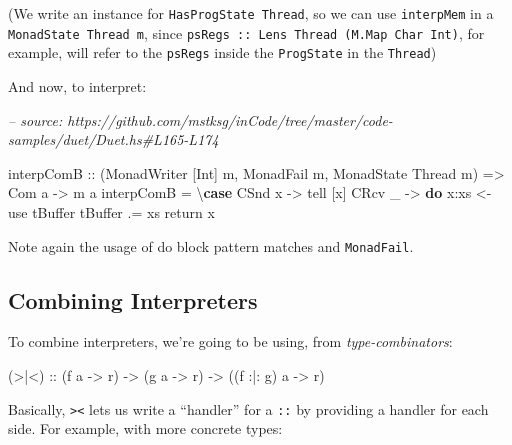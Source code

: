 \documentclass[]{article}
\newenvironment{Shaded}{}{}
\newcommand{\CommentTok}[1]{\textcolor[rgb]{0.38,0.63,0.69}{\textit{#1}}}
\newcommand{\DataTypeTok}[1]{\textcolor[rgb]{0.56,0.13,0.00}{#1}}
\newcommand{\FunctionTok}[1]{\textcolor[rgb]{0.02,0.16,0.49}{#1}}
\newcommand{\KeywordTok}[1]{\textcolor[rgb]{0.00,0.44,0.13}{\textbf{#1}}}
\newcommand{\NormalTok}[1]{#1}
\newcommand{\OtherTok}[1]{\textcolor[rgb]{0.00,0.44,0.13}{#1}}
\begin{document}
(We write an instance for \texttt{HasProgState\ Thread}, so we can use
\texttt{interpMem} in a \texttt{MonadState\ Thread\ m}, since
\texttt{psRegs\ ::\ Lens\textquotesingle{}\ Thread\ (M.Map\ Char\ Int)}, for
example, will refer to the \texttt{psRegs} inside the \texttt{ProgState} in the
\texttt{Thread})

And now, to interpret:

\begin{Shaded}
\begin{Highlighting}[]
\CommentTok{-- source: https://github.com/mstksg/inCode/tree/master/code-samples/duet/Duet.hs#L165-L174}

\NormalTok{interpComB}
\OtherTok{    ::}\NormalTok{ (}\DataTypeTok{MonadWriter}\NormalTok{ [}\DataTypeTok{Int}\NormalTok{] m, }\DataTypeTok{MonadFail}\NormalTok{ m, }\DataTypeTok{MonadState} \DataTypeTok{Thread}\NormalTok{ m)}
    \OtherTok{=>} \DataTypeTok{Com}\NormalTok{ a}
    \OtherTok{->}\NormalTok{ m a}
\NormalTok{interpComB }\FunctionTok{=}\NormalTok{ \textbackslash{}}\KeywordTok{case}
    \DataTypeTok{CSnd}\NormalTok{ x }\OtherTok{->}\NormalTok{ tell [x]}
    \DataTypeTok{CRcv}\NormalTok{ _ }\OtherTok{->} \KeywordTok{do}
\NormalTok{      x}\FunctionTok{:}\NormalTok{xs }\OtherTok{<-}\NormalTok{ use tBuffer}
\NormalTok{      tBuffer }\FunctionTok{.=}\NormalTok{ xs}
\NormalTok{      return x}
\end{Highlighting}
\end{Shaded}

Note again the usage of do block pattern matches and \texttt{MonadFail}.

\hypertarget{combining-interpreters}{%
\subsection{Combining Interpreters}\label{combining-interpreters}}

To combine interpreters, we're going to be using, from \emph{type-combinators}:

\begin{Shaded}
\begin{Highlighting}[]
\OtherTok{(>|<) ::}\NormalTok{ (f a }\OtherTok{->}\NormalTok{ r)}
      \OtherTok{->}\NormalTok{ (g a }\OtherTok{->}\NormalTok{ r)}
      \OtherTok{->}\NormalTok{ ((f }\FunctionTok{:|:}\NormalTok{ g) a }\OtherTok{->}\NormalTok{ r)}
\end{Highlighting}
\end{Shaded}

Basically, \texttt{\textgreater{}\textbar{}\textless{}} lets us write a
``handler'' for a \texttt{:\textbar{}:} by providing a handler for each side.
For example, with more concrete types:
\end{document}
